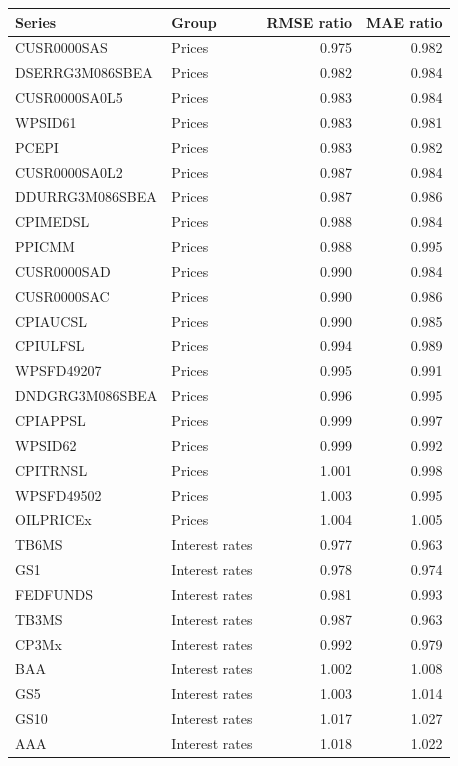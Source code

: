 \begin{table}[ht]
\centering
\begingroup\scriptsize
\begin{tabular}{llrr}
\toprule
\textbf{Series} & \textbf{Group} & \textbf{RMSE ratio} & \textbf{MAE ratio} \\
\midrule
CUSR0000SAS & Prices & 0.975 & 0.982 \\
DSERRG3M086SBEA & Prices & 0.982 & 0.984 \\
CUSR0000SA0L5 & Prices & 0.983 & 0.984 \\
WPSID61 & Prices & 0.983 & 0.981 \\
PCEPI & Prices & 0.983 & 0.982 \\
CUSR0000SA0L2 & Prices & 0.987 & 0.984 \\
DDURRG3M086SBEA & Prices & 0.987 & 0.986 \\
CPIMEDSL & Prices & 0.988 & 0.984 \\
PPICMM & Prices & 0.988 & 0.995 \\
CUSR0000SAD & Prices & 0.990 & 0.984 \\
CUSR0000SAC & Prices & 0.990 & 0.986 \\
CPIAUCSL & Prices & 0.990 & 0.985 \\
CPIULFSL & Prices & 0.994 & 0.989 \\
WPSFD49207 & Prices & 0.995 & 0.991 \\
DNDGRG3M086SBEA & Prices & 0.996 & 0.995 \\
CPIAPPSL & Prices & 0.999 & 0.997 \\
WPSID62 & Prices & 0.999 & 0.992 \\
CPITRNSL & Prices & 1.001 & 0.998 \\
WPSFD49502 & Prices & 1.003 & 0.995 \\
OILPRICEx & Prices & 1.004 & 1.005 \\
TB6MS & Interest rates & 0.977 & 0.963 \\
GS1 & Interest rates & 0.978 & 0.974 \\
FEDFUNDS & Interest rates & 0.981 & 0.993 \\
TB3MS & Interest rates & 0.987 & 0.963 \\
CP3Mx & Interest rates & 0.992 & 0.979 \\
BAA & Interest rates & 1.002 & 1.008 \\
GS5 & Interest rates & 1.003 & 1.014 \\
GS10 & Interest rates & 1.017 & 1.027 \\
AAA & Interest rates & 1.018 & 1.022 \\

\end{tabular}
\end{table}
